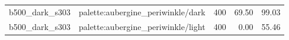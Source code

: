 \begin{longtable}{l>{\raggedright\arraybackslash}p{.42\linewidth}rrr}
b500\_\allowbreak{}dark\_\allowbreak{}s303 & %
palette:aubergine\_\allowbreak{}periwinkle/dark & %
400 & %
69.50 & %
99.03 \\ %

b500\_\allowbreak{}dark\_\allowbreak{}s303 & %
palette:aubergine\_\allowbreak{}periwinkle/light & %
400 & %
0.00 & %
55.46 \\ %


\end{longtable}
